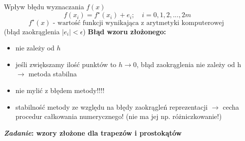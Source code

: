 	\begin{frame}{Wpływ błędu wyznaczania $f(x)$}
        $$
        f(x_{i})=f^{\star}(x_{i})+e_{i};\quad i=0, 1, 2, . . ., 2m
        $$
		$$
        f^{\star}(x) \textrm{ - wartość funkcji wynikająca z arytmetyki komputerowej }
        $$
        (błąd zaokrąglenia $|e_{i}|<\epsilon$)
        \newline
        \newline
		\textbf{Błąd wzoru złożonego:}
        \begin{itemize}
        \item nie zależy od $h$
        
		\item jeśli zwiększamy ilość punktów to $h\rightarrow 0$, błąd zaokrąglenia nie zależy od h $\rightarrow$ metoda  stabilna
        
		\item nie mylić z błędem metody!!!!
        
		\item stabilność metody ze względu na błędy zaokrągleń reprezentacji $\rightarrow$ cecha procedur całkowania numerycznego! (nie ma jej np. różniczkowanie!)
		\end{itemize}
		\textbf{{\it Zadanie}: wzory złożone dla trapezów i prostokątów}
        
    \end{frame}
